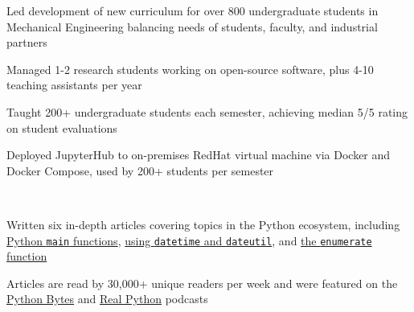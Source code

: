 \begin{tightemize}
\item Led development of new curriculum for over 800 undergraduate students in Mechanical Engineering balancing needs of students, faculty, and industrial partners
\item Managed 1-2 research students working on open-source software, plus 4-10 teaching assistants per year
\item Taught 200+ undergraduate students each semester, achieving median 5/5 rating on student evaluations
\item Deployed JupyterHub to on-premises RedHat virtual machine via Docker and Docker Compose, used by 200+ students per semester
\end{tightemize}
\sectionsep

\\
\begin{tightemize}
\item Written six in-depth articles covering topics in the Python ecosystem, including \href{https://realpython.com/python-main-function/}{Python \texttt{main} functions}, \href{https://realpython.com/python-datetime/}{using \texttt{datetime} and \texttt{dateutil}}, and \href{https://realpython.com/python-enumerate/}{the \texttt{enumerate} function}
\item Articles are read by 30,000+ unique readers per week and were featured on the \href{https://pythonbytes.fm/episodes/show/151/certified-it-works-on-my-machine}{Python Bytes} and \href{https://realpython.com/podcasts/rpp/21/}{Real Python} podcasts
\end{tightemize}

\sectionsep

